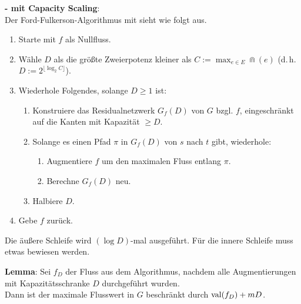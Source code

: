 \textbf{- mit Capacity Scaling}:\\
Der Ford-Fulkerson-Algorithmus mit  sieht wie folgt aus.
\begin{enumerate}
    \item
    Starte mit $f$ als Nullfluss.
    
    \item
    Wähle $D$ als die größte Zweierpotenz kleiner als $C := \max_{e \in E} \Cap(e)$
    (d.\,h. $D := 2^{\lfloor \log_2 C \rfloor}$).
    
    \item
    Wiederhole Folgendes, solange $D \ge 1$ ist:
    \begin{enumerate}
        \item
        Konstruiere das Residualnetzwerk $G_f(D)$ von $G$ bzgl. $f$,
        eingeschränkt auf die Kanten mit Kapazität $\ge D$.
        
        \item
        Solange es einen Pfad $\pi$ in $G_f(D)$ von $s$ nach $t$ gibt, wiederhole:
        \begin{enumerate}
            \item
            Augmentiere $f$ um den maximalen Fluss entlang $\pi$.
            
            \item
            Berechne $G_f(D)$ neu.
        \end{enumerate}
        
        \item
        Halbiere $D$.
    \end{enumerate}
    
    \item
    Gebe $f$ zurück.
\end{enumerate}

\linie

Die äußere Schleife wird $(\log D)$-mal ausgeführt.
Für die innere Schleife muss etwas bewiesen werden.

\textbf{Lemma}:
Sei $f_D$ der Fluss aus dem Algorithmus, nachdem alle Augmentierungen mit Kapazitätsschranke $D$
durchgeführt wurden.\\
Dann ist der maximale Flusswert in $G$ beschränkt durch $\operatorname{val}(f_D) + mD$.

